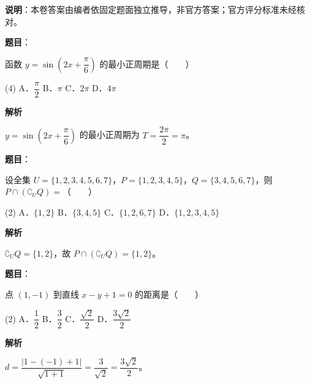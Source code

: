 
\textbf{说明}：本卷答案由编者依固定题面独立推导，非官方答案；官方评分标准未经核对。

\begin{answer}

\textbf{题目}：

函数 $y = \sin\left(2x + \dfrac{\pi}{6}\right)$ 的最小正周期是\mbox{（　　）}

\begin{gkopts}(4)
\task A．$\dfrac{\pi}{2}$
\task B．$\pi$
\task C．$2\pi$
\task D．$4\pi$
\end{gkopts}

\textbf{解析}

$y = \sin\left(2x + \dfrac{\pi}{6}\right)$ 的最小正周期为 $T = \dfrac{2\pi}{2} = \pi$。


\end{answer}
\begin{answer}

\textbf{题目}：

设全集 $U = \{1, 2, 3, 4, 5, 6, 7\}$，$P = \{1, 2, 3, 4, 5\}$，$Q = \{3, 4, 5, 6, 7\}$，则 $P \cap (\complement_U Q) =$\mbox{（　　）}

\begin{gkopts}(2)
\task A．$\{1, 2\}$
\task B．$\{3, 4, 5\}$
\task C．$\{1, 2, 6, 7\}$
\task D．$\{1, 2, 3, 4, 5\}$
\end{gkopts}

\textbf{解析}

$\complement_U Q = \{1, 2\}$，故 $P \cap (\complement_U Q) = \{1, 2\}$。


\end{answer}
\begin{answer}

\textbf{题目}：

点 $(1, -1)$ 到直线 $x - y + 1 = 0$ 的距离是\mbox{（　　）}

\begin{gkopts}(2)
\task A．$\dfrac{1}{2}$
\task B．$\dfrac{3}{2}$
\task C．$\dfrac{\sqrt{2}}{2}$
\task D．$\dfrac{3\sqrt{2}}{2}$
\end{gkopts}

\textbf{解析}

$d = \dfrac{|1 - (-1) + 1|}{\sqrt{1 + 1}} = \dfrac{3}{\sqrt{2}} = \dfrac{3\sqrt{2}}{2}$。


\end{answer}
